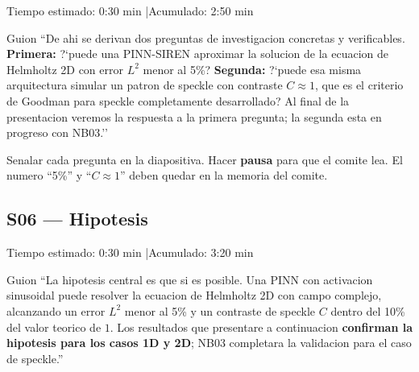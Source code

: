 \begin{timebox}
Tiempo estimado: 0:30 min \quad|\quad Acumulado: 2:50 min
\end{timebox}
\vspace{4pt}

\begin{slidebox}{Guion}
``De ahi se derivan dos preguntas de investigacion concretas y verificables.
\textbf{Primera:} ?`puede una PINN-SIREN aproximar la solucion de la ecuacion de
Helmholtz 2D con error $L^2$ menor al 5\%?
\textbf{Segunda:} ?`puede esa misma arquitectura simular un patron de speckle con
contraste $C \approx 1$, que es el criterio de Goodman para speckle completamente
desarrollado?
Al final de la presentacion veremos la respuesta a la primera pregunta; la segunda
esta en progreso con NB03.''
\end{slidebox}
\vspace{4pt}

\begin{tipbox}
Senalar cada pregunta en la diapositiva. Hacer \textbf{pausa} para que el comite lea.
El numero ``5\%'' y ``$C \approx 1$'' deben quedar en la memoria del comite.
\end{tipbox}

\vspace{8pt}

\subsection{S06 --- Hipotesis}

\begin{timebox}
Tiempo estimado: 0:30 min \quad|\quad Acumulado: 3:20 min
\end{timebox}
\vspace{4pt}

\begin{slidebox}{Guion}
``La hipotesis central es que si es posible. Una PINN con activacion sinusoidal
puede resolver la ecuacion de Helmholtz 2D con campo complejo, alcanzando un error
$L^2$ menor al 5\% y un contraste de speckle $C$ dentro del 10\% del valor teorico de
$1$. Los resultados que presentare a continuacion \textbf{confirman la hipotesis para
los casos 1D y 2D}; NB03 completara la validacion para el caso de speckle.''
\end{slidebox}
\vspace{4pt}

